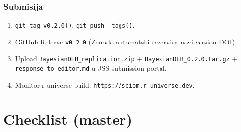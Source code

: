 \documentclass[11pt,a4paper]{article}
\newcommand{\fn}[1]{\texttt{\small #1()}}
\newcommand{\code}[1]{\texttt{\small #1}}
\begin{document}
\subsubsection*{Submisija}

\begin{enumerate}[leftmargin=1.4em,nosep]
  \item \fn{git tag v0.2.0}, \fn{git push --tags}.
  \item GitHub Release \texttt{v0.2.0} (Zenodo automatski
    rezervira novi version-DOI).
  \item Upload \code{BayesianDEB\_replication.zip} +
    \code{BayesianDEB\_0.2.0.tar.gz} +
    \code{response\_to\_editor.md} u JSS submission portal.
  \item Monitor r-universe build: \code{https://sciom.r-universe.dev}.
\end{enumerate}

\section{Checklist (master)}
\end{document}
